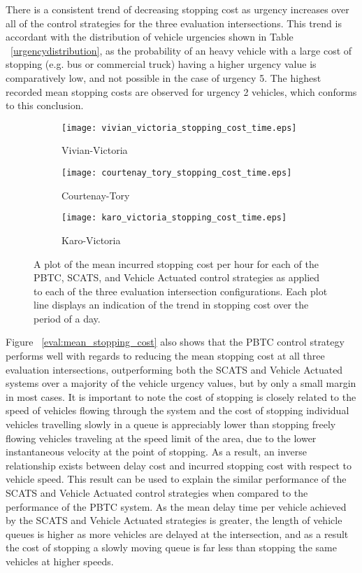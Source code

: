 There is a consistent trend of decreasing stopping cost as urgency increases over all of the control strategies for the three evaluation intersections. This trend is accordant with the distribution of vehicle urgencies shown in Table ~\ref{urgencydistribution}, as the probability of an heavy vehicle with a large cost of stopping (e.g. bus or commercial truck) having a higher urgency value is comparatively low, and not possible in the case of urgency 5. The highest recorded mean stopping costs are observed for urgency 2 vehicles, which conforms to this conclusion. %

\begin{figure}
\centering
\begin{subfigure}{.5\textwidth}
  \centering
  \texttt{[image: vivian\_victoria\_stopping\_cost\_time.eps]}
  \caption{Vivian-Victoria}
  \label{stopping_cost_time:sub1}
\end{subfigure}%
\begin{subfigure}{.5\textwidth}
  \centering
  \texttt{[image: courtenay\_tory\_stopping\_cost\_time.eps]}
  \caption{Courtenay-Tory}
  \label{stopping_cost_time:sub2}
\end{subfigure}

\vspace{1cm}

\begin{subfigure}{.5\textwidth}
  \centering
  \texttt{[image: karo\_victoria\_stopping\_cost\_time.eps]}
  \caption{Karo-Victoria}
  \label{stopping_cost_time:sub3}
\end{subfigure}%
\caption{ A plot of the mean incurred stopping cost per hour for each of the PBTC, SCATS, and Vehicle Actuated control strategies as applied to each of the three evaluation intersection configurations. Each plot line displays an indication of the trend in stopping cost over the period of a day.  }
\label{eval:stopping_cost_time }
\end{figure}

Figure ~\ref{eval:mean_stopping_cost} also shows that the PBTC control strategy performs well with regards to reducing the mean stopping cost at all three evaluation intersections, outperforming both the SCATS and Vehicle Actuated systems over a majority of the vehicle urgency values, but by only a small margin in most cases. It is important to note the cost of stopping is closely related to the speed of vehicles flowing through the system and the cost of stopping individual vehicles travelling slowly in a queue is appreciably lower than stopping freely flowing vehicles traveling at the speed limit of the area, due to the lower instantaneous velocity at the point of stopping. As a result, an inverse relationship exists between delay cost and incurred stopping cost with respect to vehicle speed. This result can be used to explain the similar performance of the SCATS and Vehicle Actuated control strategies when compared to the performance of the PBTC system. As the mean delay time per vehicle achieved by the SCATS and Vehicle Actuated strategies is greater, the length of vehicle queues is higher as more vehicles are delayed at the intersection, and as a result the cost of stopping a slowly moving queue is far less than stopping the same vehicles at higher speeds.


